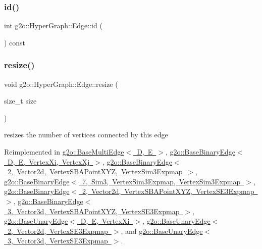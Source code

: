 \mbox{\label{classg2o_1_1_hyper_graph_1_1_edge_a93f47febcbd6c654fc3344d4643a087f}} 
\subsubsection{\texorpdfstring{id()}{id()}}
{\footnotesize\ttfamily int g2o\+::\+Hyper\+Graph\+::\+Edge\+::id (\begin{DoxyParamCaption}{ }\end{DoxyParamCaption}) const\hspace{0.3cm}{\ttfamily [inline]}}

\mbox{\label{classg2o_1_1_hyper_graph_1_1_edge_ad8913f1149a0fd5bb628f0f1c8a91a55}} 
\subsubsection{\texorpdfstring{resize()}{resize()}}
{\footnotesize\ttfamily void g2o\+::\+Hyper\+Graph\+::\+Edge\+::resize (\begin{DoxyParamCaption}\item[{size\+\_\+t}]{size }\end{DoxyParamCaption})\hspace{0.3cm}{\ttfamily [virtual]}}

resizes the number of vertices connected by this edge 

Reimplemented in \mbox{\hyperlink{classg2o_1_1_base_multi_edge_ae07ec9359cd515d0abc2100ee8aae93f}{g2o\+::\+Base\+Multi\+Edge$<$ D, E $>$}}, \mbox{\hyperlink{classg2o_1_1_base_binary_edge_a06e64067fa5fff4a5e2d058249b55478}{g2o\+::\+Base\+Binary\+Edge$<$ D, E, Vertex\+Xi, Vertex\+Xj $>$}}, \mbox{\hyperlink{classg2o_1_1_base_binary_edge_a06e64067fa5fff4a5e2d058249b55478}{g2o\+::\+Base\+Binary\+Edge$<$ 2, Vector2d, Vertex\+S\+B\+A\+Point\+X\+Y\+Z, Vertex\+Sim3\+Expmap $>$}}, \mbox{\hyperlink{classg2o_1_1_base_binary_edge_a06e64067fa5fff4a5e2d058249b55478}{g2o\+::\+Base\+Binary\+Edge$<$ 7, Sim3, Vertex\+Sim3\+Expmap, Vertex\+Sim3\+Expmap $>$}}, \mbox{\hyperlink{classg2o_1_1_base_binary_edge_a06e64067fa5fff4a5e2d058249b55478}{g2o\+::\+Base\+Binary\+Edge$<$ 2, Vector2d, Vertex\+S\+B\+A\+Point\+X\+Y\+Z, Vertex\+S\+E3\+Expmap $>$}}, \mbox{\hyperlink{classg2o_1_1_base_binary_edge_a06e64067fa5fff4a5e2d058249b55478}{g2o\+::\+Base\+Binary\+Edge$<$ 3, Vector3d, Vertex\+S\+B\+A\+Point\+X\+Y\+Z, Vertex\+S\+E3\+Expmap $>$}}, \mbox{\hyperlink{classg2o_1_1_base_unary_edge_a01fcdfd2d3ed0325655bb99db95c0b10}{g2o\+::\+Base\+Unary\+Edge$<$ D, E, Vertex\+Xi $>$}}, \mbox{\hyperlink{classg2o_1_1_base_unary_edge_a01fcdfd2d3ed0325655bb99db95c0b10}{g2o\+::\+Base\+Unary\+Edge$<$ 2, Vector2d, Vertex\+S\+E3\+Expmap $>$}}, and \mbox{\hyperlink{classg2o_1_1_base_unary_edge_a01fcdfd2d3ed0325655bb99db95c0b10}{g2o\+::\+Base\+Unary\+Edge$<$ 3, Vector3d, Vertex\+S\+E3\+Expmap $>$}}.

